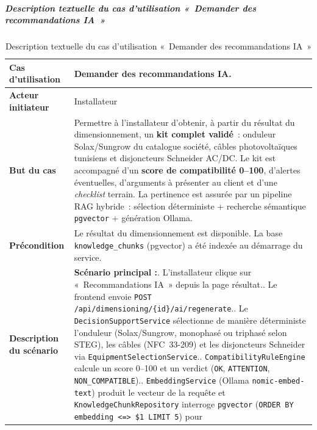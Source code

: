 \subparagraph{Description textuelle du cas d'utilisation «~Demander des recommandations IA~»}

\begin{table}[H]
  \caption{Description textuelle du cas d'utilisation «~Demander des recommandations IA~»}
  \label{tab:cu-demander-reco}
  \centering
  \begin{tabularx}{\textwidth}{|L{3.8cm}|X|}
    \hline
    \textbf{Cas d'utilisation} & Demander des recommandations IA. \\
    \hline
    \textbf{Acteur initiateur} & Installateur \\
    \hline
    \textbf{But du cas} & Permettre à l'installateur d'obtenir, à partir du
      résultat du dimensionnement, un \textbf{kit complet validé}~: onduleur
      Solax/Sungrow du catalogue société, câbles photovoltaïques tunisiens et
      disjoncteurs Schneider AC/DC. Le kit est accompagné d'un \textbf{score de
      compatibilité 0--100}, d'alertes éventuelles, d'arguments à présenter au
      client et d'une \textit{checklist} terrain. La pertinence est assurée par
      un pipeline RAG hybride~: sélection déterministe + recherche sémantique
      \texttt{pgvector} + génération Ollama. \\
    \hline
    \textbf{Précondition} & Le résultat du dimensionnement est disponible.
      La base \texttt{knowledge\_chunks} (pgvector) a été indexée au démarrage
      du service. \\
    \hline
    \textbf{Description du scénario} &
    \textbf{Scénario principal :}. L'installateur clique sur «~Recommandations IA~» depuis la page résultat.. Le frontend envoie \texttt{POST /api/dimensioning/\{id\}/ai/regenerate}.. Le \texttt{DecisionSupportService} sélectionne de manière déterministe
       l'onduleur (Solax/Sungrow, monophasé ou triphasé selon STEG), les
       câbles (NFC~33-209) et les disjoncteurs Schneider via
       \texttt{EquipmentSelectionService}.. \texttt{CompatibilityRuleEngine} calcule un score 0--100 et un verdict
       (\texttt{OK}, \texttt{ATTENTION}, \texttt{NON\_COMPATIBLE}).. \texttt{EmbeddingService} (Ollama \texttt{nomic-embed-text}) produit le
       vecteur de la requête et \texttt{KnowledgeChunkRepository} interroge
       \texttt{pgvector} (\texttt{ORDER BY embedding <=> \$1 LIMIT 5}) pour

\end{tabularx}
\end{table}
